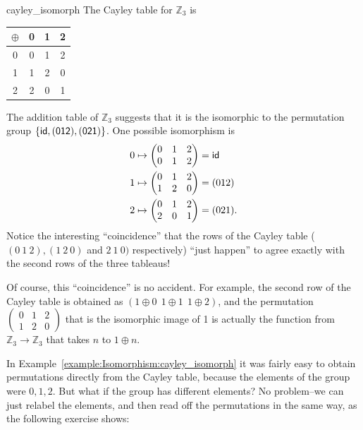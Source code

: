\begin{example}{cayley_isomorph}
The Cayley table for ${\mathbb Z}_3$ is  
\begin{center}
\begin{tabular}{c|ccc}
$\oplus$   & 0 & 1 & 2 \\
\hline
0     & 0 & 1 & 2 \\
1     & 1 & 2 & 0 \\
2     & 2 & 0 & 1
\end{tabular}
\end{center}
The addition table of ${\mathbb Z}_3$ suggests that it is the isomorphic to the permutation group $ \{ \sf{id}, (0 1 2), (0 2 1) \}$.  One possible isomorphism  is 
\begin{align*}
0 & \mapsto
\begin{pmatrix}
0 & 1 & 2 \\
0 & 1 & 2
\end{pmatrix}
= \sf{id} \\
1 & \mapsto
\begin{pmatrix}
0 & 1 & 2 \\
1 & 2 & 0
\end{pmatrix}
= (0 1 2) \\
2 & \mapsto
\begin{pmatrix}
0 & 1 & 2 \\
2 & 0 & 1
\end{pmatrix}
= (0 2 1).
\end{align*}
Notice the interesting ``coincidence'' that  the rows of the Cayley table ( $(0~1~2), (1~2~0)$ and $2~1~0)$ respectively)  ``just happen'' to agree exactly with the second rows of the three tableaus! 

Of course, this ``coincidence'' is no accident.
For example, the second row of the Cayley table is obtained as $(1\oplus 0~~1\oplus 1~~1\oplus 2)$, and the permutation $\begin{pmatrix}
0 & 1 & 2 \\
1 & 2 & 0
\end{pmatrix}$ 
that is the isomorphic image of 1 is actually the function from ${\mathbb Z}_3 \rightarrow {\mathbb Z}_3$ that takes $n$ to $1 \oplus n$.   
\end{example}

In Example~\ref{example:Isomorphism:cayley_isomorph} it was fairly easy to obtain permutations directly from the Cayley table, because the elements of the group were $0,1,2$.  But what if the group has different elements? No problem--we can just relabel the elements, and then read off the permutations in the same way, as the following exercise shows:  

